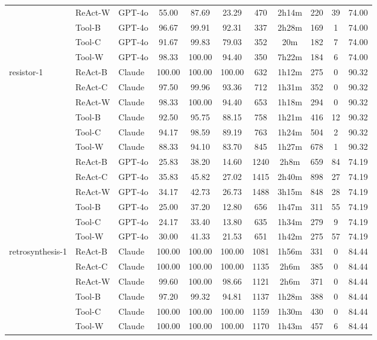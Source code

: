 \begin{longtable}{lllcccccccc}
 & ReAct-W & GPT-4o & 55.00 & 87.69 & 23.29 & 470 & 2h14m & 220 & 39 & 74.00 \\
 & Tool-B & GPT-4o & 96.67 & 99.91 & 92.31 & 337 & 2h28m & 169 & 1 & 74.00 \\
 & Tool-C & GPT-4o & 91.67 & 99.83 & 79.03 & 352 & 20m & 182 & 7 & 74.00 \\
 & Tool-W & GPT-4o & 98.33 & 100.00 & 94.40 & 350 & 7h22m & 184 & 6 & 74.00 \\
resistor-1 & ReAct-B & Claude & 100.00 & 100.00 & 100.00 & 632 & 1h12m & 275 & 0 & 90.32 \\
 & ReAct-C & Claude & 97.50 & 99.96 & 93.36 & 712 & 1h31m & 352 & 0 & 90.32 \\
 & ReAct-W & Claude & 98.33 & 100.00 & 94.40 & 653 & 1h18m & 294 & 0 & 90.32 \\
 & Tool-B & Claude & 92.50 & 95.75 & 88.15 & 758 & 1h21m & 416 & 12 & 90.32 \\
 & Tool-C & Claude & 94.17 & 98.59 & 89.19 & 763 & 1h24m & 504 & 2 & 90.32 \\
 & Tool-W & Claude & 88.33 & 94.10 & 83.70 & 845 & 1h27m & 678 & 1 & 90.32 \\
 & ReAct-B & GPT-4o & 25.83 & 38.20 & 14.60 & 1240 & 2h8m & 659 & 84 & 74.19 \\
 & ReAct-C & GPT-4o & 35.83 & 45.82 & 27.02 & 1415 & 2h40m & 898 & 27 & 74.19 \\
 & ReAct-W & GPT-4o & 34.17 & 42.73 & 26.73 & 1488 & 3h15m & 848 & 28 & 74.19 \\
 & Tool-B & GPT-4o & 25.00 & 37.20 & 12.80 & 656 & 1h47m & 311 & 55 & 74.19 \\
 & Tool-C & GPT-4o & 24.17 & 33.40 & 13.80 & 635 & 1h34m & 279 & 9 & 74.19 \\
 & Tool-W & GPT-4o & 30.00 & 41.33 & 21.53 & 651 & 1h42m & 275 & 57 & 74.19 \\
retrosynthesis-1 & ReAct-B & Claude & 100.00 & 100.00 & 100.00 & 1081 & 1h56m & 331 & 0 & 84.44 \\
 & ReAct-C & Claude & 100.00 & 100.00 & 100.00 & 1135 & 2h6m & 385 & 0 & 84.44 \\
 & ReAct-W & Claude & 99.60 & 100.00 & 98.66 & 1121 & 2h6m & 371 & 0 & 84.44 \\
 & Tool-B & Claude & 97.20 & 99.32 & 94.81 & 1137 & 1h28m & 388 & 0 & 84.44 \\
 & Tool-C & Claude & 100.00 & 100.00 & 100.00 & 1159 & 1h30m & 430 & 0 & 84.44 \\
 & Tool-W & Claude & 100.00 & 100.00 & 100.00 & 1170 & 1h43m & 457 & 6 & 84.44 \\

\end{longtable}
